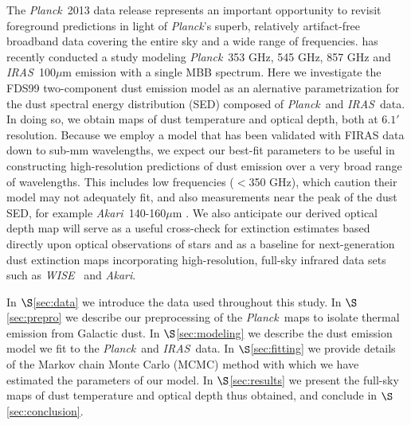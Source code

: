 \documentclass{emulateapj}
\newcommand{\IRAS}{{\it IRAS}}
\newcommand{\PLANCK}{{\it Planck}}
\newcommand{\AKARI}{{\it Akari}}
\newcommand{\WISE}{{\it WISE}}
\begin{document}




The \PLANCK~2013 data release \citep{planck2013} represents an important 
opportunity to revisit foreground predictions in light of \PLANCK's superb, 
relatively artifact-free broadband data covering the entire sky and a wide 
range of frequencies. \cite{planckdust} has recently conducted a study modeling
\PLANCK~353 GHz, 545 GHz, 857 GHz and \IRAS~100$\mu$m emission with a single
MBB spectrum. Here we investigate the FDS99 two-component dust emission model 
as an alernative parametrization for the dust spectral energy distribution 
(SED) composed  of \PLANCK~and \IRAS~data. In doing so, we obtain maps of dust 
temperature and optical depth, both at $6.1'$ resolution. Because we employ a 
model that has been validated with FIRAS data down to sub-mm wavelengths, we 
expect our best-fit parameters to be useful in constructing high-resolution 
predictions of dust emission over a very broad range of wavelengths. This 
includes low frequencies ($<$350 GHz), which \cite{planckdust} caution their 
model may not adequately fit, and also measurements near the peak of the dust 
SED, for example \AKARI~140-160$\mu$m \citep{akari}. We also anticipate our 
derived optical depth map will serve as a useful cross-check for extinction 
estimates based directly upon optical observations of stars
\citep[e.g.][]{green14} and as a baseline for next-generation dust extinction 
maps incorporating high-resolution, full-sky infrared data sets such as 
\WISE~\citep{wright10, meisner14} and \AKARI.


In $\S$\ref{sec:data} we introduce the data used throughout this study. In 
$\S$\ref{sec:prepro} we describe our preprocessing of the \PLANCK~maps to 
isolate thermal emission from Galactic dust. In $\S$\ref{sec:modeling} we 
describe the dust emission model we fit to the \PLANCK~and \IRAS~data. In 
$\S$\ref{sec:fitting} we provide details of the Markov chain Monte Carlo (MCMC)
 method with which we have estimated the parameters of our model. In 
$\S$\ref{sec:results} we present the full-sky maps of dust temperature and 
optical depth thus obtained, and conclude in $\S$\ref{sec:conclusion}.
\end{document}

